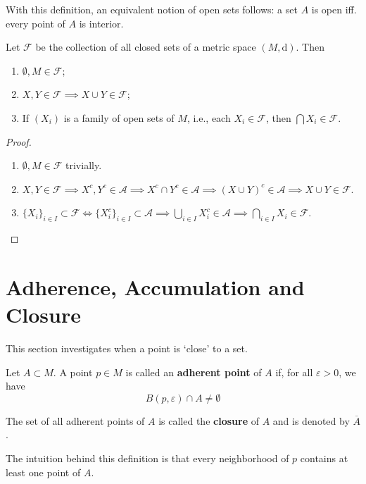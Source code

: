 With this definition, an equivalent notion of open sets follows: a set $A$ is open iff. every point of $A$ is interior.

\begin{proposition}
    Let $\mathcal{F}$ be the collection of all closed sets of a metric space $(M, \mathrm{d})$. Then
    \begin{enumerate}
        \item $\emptyset, M \in \mathcal{F}$;
        \item $X, Y \in \mathcal{F} \implies X \cup Y \in \mathcal{F}$;
        \item If $(X_i)$ is a family of open sets of $M$, i.e., each $X_i \in \mathcal{F}$, then $\bigcap X_i \in \mathcal{F}$.
    \end{enumerate}
\end{proposition}

\begin{proof}
    \begin{enumerate}
        \item $\emptyset, M \in \mathcal{F}$ trivially.
        \item $X, Y \in \mathcal{F} \implies X^c, Y^c \in \mathcal{A} \implies X^c \cap Y^c \in \mathcal{A} \implies (X \cup Y)^c \in \mathcal{A} \implies X \cup Y \in \mathcal{F}$.
        \item $\{ X_i \}_{i \in I} \subset \mathcal{F} \iff \{ X_i^c \}_{i \in I} \subset \mathcal{A} \implies \bigcup_{i \in I} X_i^c \in \mathcal{A} \implies \bigcap_{i \in I} X_i \in \mathcal{F}$.
    \end{enumerate}
\end{proof}

\section{Adherence, Accumulation and Closure}

This section investigates when a point is `close' to a set.

\begin{definition}
    Let $A \subset M$. A point $p \in M$ is called an \textbf{adherent point} of $A$ if, for all $\varepsilon > 0$, we have
    \[
        B(p, \varepsilon) \cap A \neq \emptyset
    \]

    The set of all adherent points of $A$ is called the \textbf{closure} of $A$ and is denoted by $\overline{A}$.
\end{definition}

The intuition behind this definition is that every neighborhood of $p$ contains at least one point of $A$.

